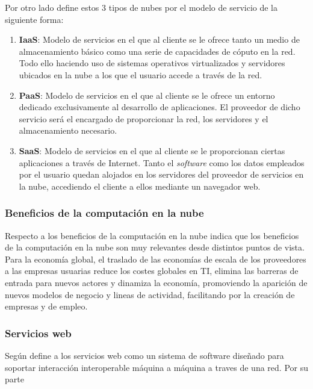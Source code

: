 Por otro lado \cite{msolutions} define estos 3 tipos de nubes por el modelo de servicio
de la siguiente forma:
\begin{enumerate}
    \item \textbf{IaaS}: Modelo de servicios en el que al cliente se le ofrece tanto un
          medio de almacenamiento básico como una serie de capacidades de cóputo en la red.
          Todo ello haciendo uso de sistemas operativos virtualizados y servidores ubicados
          en la nube a los que el usuario accede a través de la red.
    \item \textbf{PaaS}: Modelo de servicios en el que al cliente se le ofrece un entorno
          dedicado exclusivamente al desarrollo de aplicaciones. El proveedor de dicho servicio será
          el encargado de proporcionar la red, los servidores y el almacenamiento necesario.
    \item \textbf{SaaS}: Modelo de servicios en el que al cliente se le proporcionan ciertas aplicaciones
          a través de Internet. Tanto el \emph{software} como los datos empleados por el usuario
          quedan alojados en los servidores del proveedor de servicios en la nube, accediendo el cliente
          a ellos mediante un navegador web.
\end{enumerate}
\subsubsection{Beneficios de la computación en la nube}
Respecto a los beneficios de la computación en la nube \cite{cierco} indica que los beneficios
de la computación en la nube son muy relevantes desde distintos puntos de vista.
Para la economía global, el traslado de las economías de escala de los
proveedores a las empresas usuarias reduce los costes globales en TI, elimina
las barreras de entrada para nuevos actores y dinamiza la economía, promoviendo
la aparición de nuevos modelos de negocio y lineas de actividad, facilitando
por la creación de empresas y de empleo.
\subsubsection{Servicios web}

Según \cite{w3c} define a los servicios web como un sistema de software diseñado
para soportar interacción interoperable máquina a máquina a traves de una red.
Por su parte
